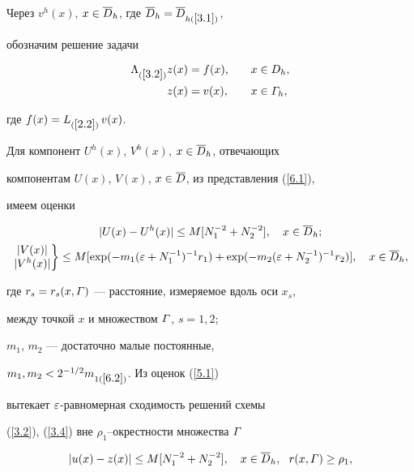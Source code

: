 Через $v^h(x)$, $x\in\overline{D}_h$, где $\overline{D}_h=\overline{D}_{h(\ref{3.1})}$,


обозначим  решение задачи


\begin{alignat*}{2}


\La_{(\ref{3.2})} z(x) &= f(x), &\quad 


x&\in D_{h},\\


z(x)&=v(x), &\quad x&\in \G_{h},


\end{alignat*}


где $f(x)=L_{(\ref{2.2})}\,v(x)$.





Для компонент $U^h(x)$, $V^h(x)$, $x\in\overline{D}_h$, отвечающих


компонентам $U(x)$, $V(x)$, $x\in\overline{D}$, из представления (\ref{6.1}),


имеем оценки


\begin{gather} \label{5.1}


|U(x)-U^h(x)|\le M[N_1^{-2}+N_2^{-2}], \quad 


x\in \Db_{h}; \\


%


\left.\begin{matrix}|V(x)| \\ |V^h(x)| \end{matrix}\right\}


\le M[\exp(-m_1(\eps+N_1^{-1})^{-1} r_1) +


\exp(-m_2(\eps+N_2^{-1})^{-1} r_2)], \quad


x\in \Db_{h}, \notag


\end{gather}


где $r_s=r_s(x,\varGamma)$ --- расстояние, измеряемое вдоль оси $x_s$,


между точкой $x$ и множеством $\varGamma$, $s=1,2$;


$m_1$, $m_2$ --- достаточно малые постоянные,


$m_1, m_2< 2^{-1/2} m_{1(\ref{6.2})}$. Из оценок (\ref{5.1})


вытекает $\varepsilon$-равномерная сходимость решений схемы


(\ref{3.2}), (\ref{3.4}) вне $\rho_1$--окрестности множества $\varGamma$


\begin{equation} \label{5.2}


|u(x)-z(x)|\le M[ N_1^{-2}+N_2^{-2}], \quad


x\in \Db_{h}, \ \ r(x,\G)\ge \rho_1,


\end{equation}


